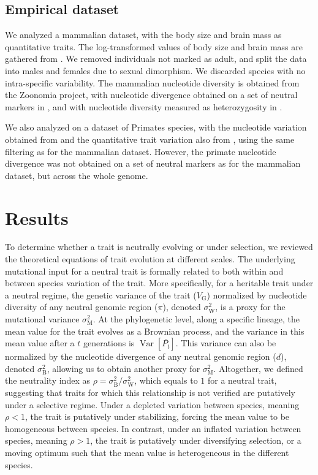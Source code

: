 \documentclass{article}
\DeclareMathOperator{\Var}{\text{Var}}
\newcommand{\Time}{t}
\newcommand{\Trait}{P}
\newcommand{\MeanTrait}{\bar{\Trait_{\Time}}}
\newcommand{\VarPhy}{\Var \left[\MeanTrait\right]}
\newcommand{\VarGenetic}{V_{\mathrm{G}}}
\newcommand{\RateMut}{\sigma^2_{\mathrm{M}}}
\newcommand{\RateBetween}{\sigma^2_{\mathrm{B}}}
\newcommand{\RateWhithin}{\sigma^2_{\mathrm{W}}}
\newcommand{\NI}{\rho}
\begin{document}
\subsection*{Empirical dataset}\label{subsec:empirical-dataset}

We analyzed a mammalian dataset, with the body size and brain mass as quantitative traits.
The log-transformed values of body size and brain mass are gathered from \textcite{tsuboi_breakdown_2018}.
We removed individuals not marked as adult, and split the data into males and females due to sexual dimorphism.
We discarded species with no intra-specific variability.
The mammalian nucleotide diversity is obtained from the Zoonomia project, with nucleotide divergence obtained on a set of neutral markers in \textcite{foley_genomic_2023}, and with nucleotide diversity measured as heterozygosity in \textcite{wilder_contribution_2023}.


We also analyzed on a dataset of Primates species, with the nucleotide variation obtained from \textcite{kuderna_global_2023} and the quantitative trait variation also from \textcite{tsuboi_breakdown_2018}, using the same filtering as for the mammalian dataset.
However, the primate nucleotide divergence was not obtained on a set of neutral markers as for the mammalian dataset, but across the whole genome.

\section*{Results}\label{sec:results}

To determine whether a trait is neutrally evolving or under selection, we reviewed the theoretical equations of trait evolution at different scales.
The underlying mutational input for a neutral trait is formally related to both within and between species variation of the trait.
More specifically, for a heritable trait under a neutral regime, the genetic variance of the trait ($\VarGenetic$) normalized by nucleotide diversity of any neutral genomic region ($\pi$), denoted $\RateWhithin$, is a proxy for the mutational variance $\RateMut$.
At the phylogenetic level, along a specific lineage, the mean value for the trait evolves as a Brownian process, and the variance in this mean value after a $\Time$ generations is $\VarPhy$.
This variance can also be normalized by the nucleotide divergence of any neutral genomic region ($d$), denoted $\RateBetween$, allowing us to obtain another proxy for $\RateMut$.
Altogether, we defined the neutrality index as $\NI = \RateBetween/\RateWhithin$, which equals to $1$ for a neutral trait, suggesting that traits for which this relationship is not verified are putatively under a selective regime.
Under a depleted variation between species, meaning $\NI < 1$, the trait is putatively under stabilizing, forcing the mean value to be homogeneous between species.
In contrast, under an inflated variation between species, meaning $\NI > 1$, the trait is putatively under diversifying selection, or a moving optimum such that the mean value is heterogeneous in the different species.
\end{document}
